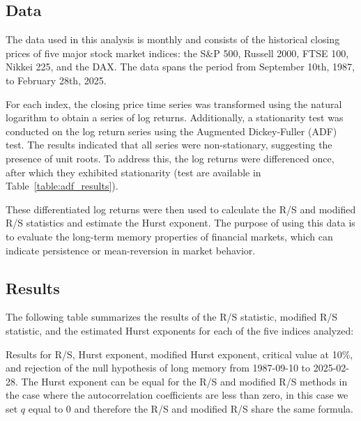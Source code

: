 \documentclass[11pt]{extarticle}
\begin{document}
\subsection{Data}
\label{sec:data}

The data used in this analysis is monthly and consists of the historical closing prices of five major stock market indices: the S\&P 500,
Russell 2000, FTSE 100, Nikkei 225, and the DAX.
The data spans the period from September 10th, 1987, to February 28th, 2025.

For each index, the closing price time series was transformed using the natural logarithm to obtain a series of log returns.
Additionally, a stationarity test was conducted on the log return series using the Augmented Dickey-Fuller (ADF) test.
The results indicated that all series were non-stationary, suggesting the presence of unit roots.
To address this, the log returns were differenced once, after which they exhibited stationarity (test are available
in Table~\ref{table:adf_results}).

These differentiated log returns were then used to calculate the R/S and modified R/S statistics and estimate the Hurst exponent.
The purpose of using this data is to evaluate the long-term memory properties of financial markets, which can indicate persistence or mean-reversion in market behavior.



\subsection{Results}

The following table summarizes the results of the R/S statistic, modified R/S statistic, and the estimated Hurst exponents for each of the five indices analyzed: \\

\begin{table}[h!]
    \centering
    \caption{Results for R/S, Hurst exponent, modified Hurst exponent, critical value at 10\%, and rejection of the null
    hypothesis of long memory from 1987-09-10 to 2025-02-28. The Hurst exponent can be equal for the R/S and modified R/S methods in the case where
    the autocorrelation coefficients are less than zero, in this case we set $q$ equal to 0 and therefore the R/S and modified R/S share the same formula.}
    \label{tab:Hurst_results}
\end{table}
\end{document}
